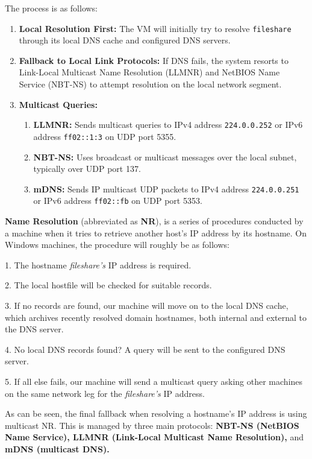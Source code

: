 The process is as follows:
\begin{enumerate}
    \item \textbf{Local Resolution First:} The VM will initially try to resolve \texttt{fileshare} through its local DNS cache and configured DNS servers.
    \item \textbf{Fallback to Local Link Protocols:} If DNS fails, the system resorts to Link-Local Multicast Name Resolution (LLMNR) and NetBIOS Name Service (NBT-NS) to attempt resolution on the local network segment.
    \item \textbf{Multicast Queries:}
    \begin{enumerate}
        \item \textbf{LLMNR:} Sends multicast queries to IPv4 address \texttt{224.0.0.252} or IPv6 address \texttt{ff02::1:3} on UDP port 5355.
        \item \textbf{NBT-NS:} Uses broadcast or multicast messages over the local subnet, typically over UDP port 137.
        \item \textbf{mDNS:} Sends IP multicast UDP packets to IPv4 address \texttt{224.0.0.251} or IPv6 address \texttt{ff02::fb} on UDP port 5353.
    \end{enumerate}
\end{enumerate}


\textbf{Name Resolution }(abbreviated as \textbf{NR}), is a series of procedures conducted by a machine when it tries to retrieve another host’s IP address by its hostname. On Windows machines, the procedure will roughly be as follows:

1. The hostname \textit{fileshare’s }IP address is required.

2. The local hostfile will be checked for suitable records.

3. If no records are found, our machine will move on to the local DNS cache, which archives recently resolved domain hostnames, both internal and external to the DNS server.

4. No local DNS records found? A query will be sent to the configured DNS server.

5. If all else fails, our machine will send a multicast query asking other machines on the same network leg for the \textit{fileshare’s} IP address.

As can be seen, the final fallback when resolving a hostname’s IP address is using multicast NR. This is managed by three main protocols: \textbf{NBT-NS (NetBIOS Name Service), LLMNR (Link-Local Multicast Name Resolution), }and \textbf{mDNS (multicast DNS).}

